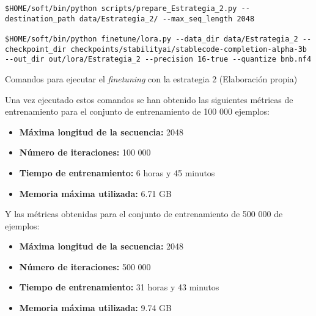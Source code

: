 \newpage
\begin{mycode}
    \begin{verbatim}
$HOME/soft/bin/python scripts/prepare_Estrategia_2.py --destination_path data/Estrategia_2/ --max_seq_length 2048

$HOME/soft/bin/python finetune/lora.py --data_dir data/Estrategia_2 --checkpoint_dir checkpoints/stabilityai/stablecode-completion-alpha-3b --out_dir out/lora/Estrategia_2 --precision 16-true --quantize bnb.nf4
\end{verbatim}
    \caption[Comandos para ejecutar el \textit{finetuning} con la estrategia 2]{Comandos para ejecutar el \textit{finetuning} con la estrategia 2 (Elaboración propia)}
    \label{code:Ejecución_Estrategia_2}
\end{mycode}

Una vez ejecutado estos comandos se han obtenido las siguientes métricas de entrenamiento
para el conjunto de entrenamiento de 100 000 ejemplos:

\begin{itemize}
    \item \textbf{Máxima longitud de la secuencia:} 2048
    \item \textbf{Número de iteraciones:} 100 000
    \item \textbf{Tiempo de entrenamiento:} 6 horas y 45 minutos
    \item \textbf{Memoria máxima utilizada:} 6.71 GB
\end{itemize}

Y las métricas obtenidas para el conjunto de entrenamiento de 500 000 de ejemplos:

\begin{itemize}
    \item \textbf{Máxima longitud de la secuencia:} 2048
    \item \textbf{Número de iteraciones:} 500 000
    \item \textbf{Tiempo de entrenamiento:} 31 horas y 43 minutos
    \item \textbf{Memoria máxima utilizada:} 9.74 GB
\end{itemize}
